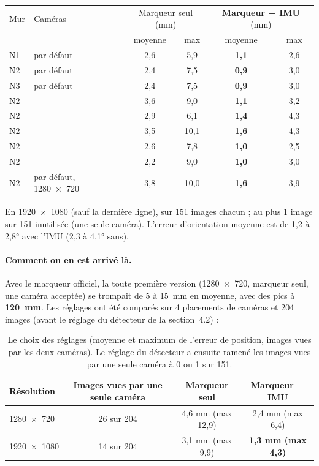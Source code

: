 \documentclass[11pt,a4paper]{article}
\newcommand{\code}[1]{\texttt{\detokenize{#1}}}
\begin{document}
\begin{center}
\begin{tabular}{llcccc}
\toprule
Mur & Caméras & \multicolumn{2}{c}{Marqueur seul (mm)} & \multicolumn{2}{c}{\textbf{Marqueur + IMU} (mm)} \\
    &         & moyenne & max & moyenne & max \\
\midrule
N1 & par défaut & 2,6 & 5,9 & \textbf{1,1} & 2,6 \\
N2 & par défaut & 2,4 & 7,5 & \textbf{0,9} & 3,0 \\
N3 & par défaut & 2,4 & 7,5 & \textbf{0,9} & 3,0 \\
N2 & \code{--shuffle 1} & 3,6 & 9,0 & \textbf{1,1} & 3,2 \\
N2 & \code{--shuffle 2} & 2,9 & 6,1 & \textbf{1,4} & 4,3 \\
N2 & \code{--shuffle 3} & 3,5 & 10,1 & \textbf{1,6} & 4,3 \\
N2 & \code{--shuffle 4} & 2,6 & 7,8 & \textbf{1,0} & 2,5 \\
N2 & \code{--shuffle 5} & 2,2 & 9,0 & \textbf{1,0} & 3,0 \\
N2 & par défaut, 1280~×~720 & 3,8 & 10,0 & \textbf{1,6} & 3,9 \\
\bottomrule
\end{tabular}
\end{center}
En 1920~×~1080 (sauf la dernière ligne), sur 151 images chacun ; au plus 1 image sur 151 inutilisée (une seule
caméra). L'erreur d'orientation moyenne est de 1,2 à 2,8° avec l'IMU (2,3 à 4,1° sans).

\paragraph{Comment on en est arrivé là.} Avec le marqueur officiel, la toute première version (1280~×~720, marqueur
seul, une caméra acceptée) se trompait de 5 à 15~mm en moyenne, avec des pics à \textbf{120~mm}. Les réglages ont été
comparés sur 4 placements de caméras et 204 images (avant le réglage du détecteur de la section~4.2) :

\begin{table}[H]
\centering
\begin{tabular}{lccc}
\toprule
Résolution & Images vues par une seule caméra & Marqueur seul & Marqueur + IMU \\
\midrule
1280~×~720 & 26 sur 204 & 4,6 mm (max 12,9) & 2,4 mm (max 6,4) \\
1920~×~1080 & 14 sur 204 & 3,1 mm (max 9,9) & \textbf{1,3 mm (max 4,3)} \\
\bottomrule
\end{tabular}
\caption{Le choix des réglages (moyenne et maximum de l'erreur de position, images vues par les deux caméras). Le
réglage du détecteur a ensuite ramené les images vues par une seule caméra à 0 ou 1 sur 151.}
\label{tab:reglages}
\end{table}
\end{document}
